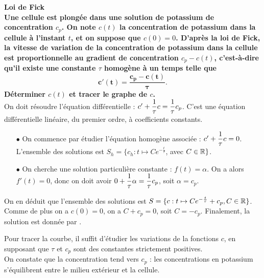 \documentclass[a4paper, 11pt,reqno]{article}
\begin{document}
\begin{correction}  \; \textbf{Loi de Fick}\\
\textbf{Une cellule est plong\'ee dans une solution de potassium de concentration $c_p$. On note $c(t)$ la concentration de potassium dans la cellule \`a l'instant $t$, et on suppose que $c(0)=0$. D'apr\`es la loi de Fick, la vitesse de variation de la concentration de potassium dans la cellule est proportionnelle au gradient de concentration $c_p-c(t)$, c'est-\`a-dire qu'il existe une constante $\tau$ homog\`ene \`a un temps telle que 
$$\mathbf{c'(t) = \frac{c_p-c(t)}{\tau}.}$$
D\'eterminer $c(t)$ et tracer le graphe de $c$.}\\
On doit r\'esoudre l'\'equation diff\'erentielle : $c' +\displaystyle \frac{1}{\tau} c = \frac{1}{\tau} c_p$. C'est une \'equation diff\'erentielle lin\'eaire, du premier ordre, \`a coefficients constants. \\
\begin{itemize}
\item[$\bullet$] On commence par \'etudier l'\'equation homog\`ene associ\'ee : $c' +\displaystyle \frac{1}{\tau} c =0$. L'ensemble des solutions est $S_h = \{c_h : t \mapsto C e^{-\frac{t}{\tau}}$, avec $C\in \mathbb{R}\}$.
\item[$\bullet$] On cherche une solution particuli\`ere constante : $f(t) = \alpha$. On a alors $f'(t) = 0$, donc on doit avoir $0 +\displaystyle \frac{1}{\tau} \alpha = \frac{1}{\tau} c_p$, soit $\alpha = c_p$.
\end{itemize}
On en d\'eduit que l'ensemble des solutions est $S=\{c : t\mapsto C e^{-\frac{t}{\tau}} + c_p, C \in \mathbb{R}\}$. Comme de plus on a $c(0) = 0$, on a $C + c_p = 0$, soit $C=-c_p$. Finalement, la solution est donn\'ee par .
\begin{center}

\hspace*{0.5cm} \begin{minipage}[c]{0.95\linewidth}
Pour tracer la courbe, il suffit d'\'etudier les variations de la fonctions $c$, en supposant que $\tau$ et $c_p$ sont des constantes strictement positives.\\
On constate que la concentration tend vers $c_p$ : les concentrations en potassium s'\'equilibrent entre le milieu ext\'erieur et la cellule.
\end{minipage}
\end{center}


\end{correction}
\end{document}
